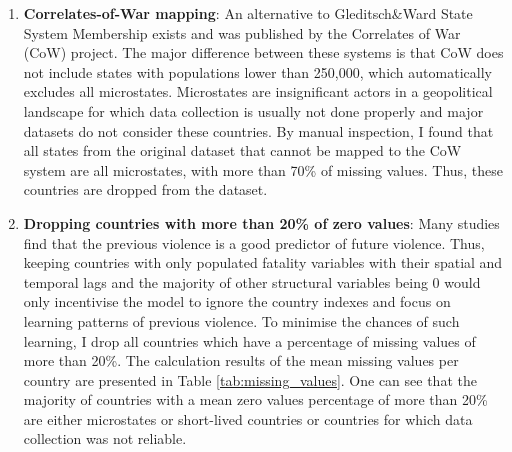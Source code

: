 \documentclass[runningheads]{llncs}
\begin{document}
    \begin{enumerate}
        \item \textbf{Correlates-of-War mapping}: An alternative to Gleditsch\&Ward State System Membership exists and was published by the Correlates of War (CoW) project. The major difference between these systems is that CoW does not include states with populations lower than 250,000, which automatically excludes all microstates. Microstates are insignificant actors in a geopolitical landscape for which data collection is usually not done properly and major datasets do not consider these countries. By manual inspection, I found that all states from the original dataset that cannot be mapped to the CoW system are all microstates, with more than 70\% of missing values. Thus, these countries are dropped from the dataset.
        \item \textbf{Dropping countries with more than 20\% of zero values}: Many studies find that the previous violence is a good predictor of future violence. Thus, keeping countries with only populated fatality variables with their spatial and temporal lags and the majority of other structural variables being 0 would only incentivise the model to ignore the country indexes and focus on learning patterns of previous violence. To minimise the chances of such learning, I drop all countries which have a percentage of missing values of more than 20\%. The calculation results of the mean missing values per country are presented in Table \ref{tab:missing_values}. One can see that the majority of countries with a mean zero values percentage of more than 20\% are either microstates or short-lived countries or countries for which data collection was not reliable.
    \end{enumerate}
\end{document}

